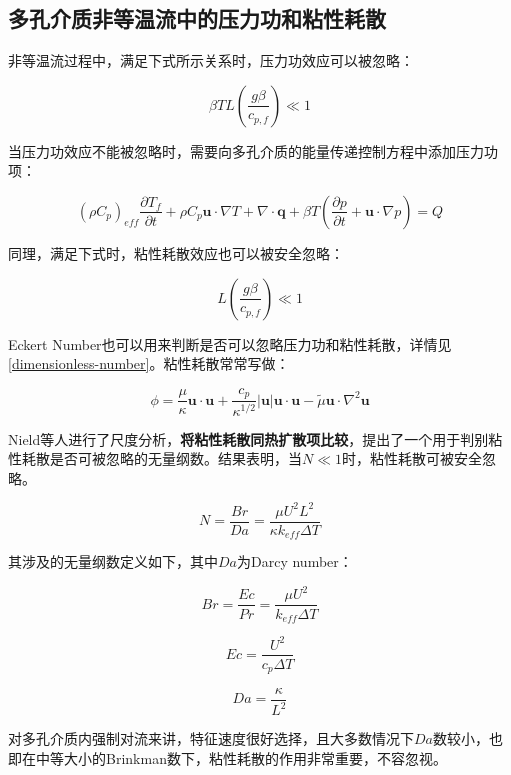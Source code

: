 \subsection{多孔介质非等温流中的压力功和粘性耗散}

非等温流过程中，满足下式所示关系时，压力功效应可以被忽略：

\begin{equation}
\beta TL\left(\frac{g\beta}{c_{p,f}}\right) \ll 1
\end{equation}

当压力功效应不能被忽略时，需要向多孔介质的能量传递控制方程中添加压力功项：

\begin{equation}
(\rho C_p)_{eff} \frac{\partial T_f}{\partial t} + \rho C_p\bm{u}\cdot\nabla T + \nabla\cdot\bm{q} + \boxed{\beta T \left(\frac{\partial p}{\partial t}+\bm{u}\cdot\nabla p\right)} = Q
\end{equation}

同理，满足下式时，粘性耗散效应也可以被安全忽略：

\begin{equation}
L \left( \frac{g\beta}{c_{p,f}} \right) \ll 1
\end{equation}

Eckert Number也可以用来判断是否可以忽略压力功和粘性耗散，详情见\autoref{dimensionless-number}。粘性耗散常常写做：

\begin{equation}
\phi = \frac{\mu}{\kappa}\bm{u\cdot u} + \frac{c_p}{\kappa^{1/2}}|\bm{u}|\bm{u\cdot u} - \tilde{\mu}\bm{u}\cdot\nabla^2\bm{u}
\end{equation}

Nield等人进行了尺度分析，\textbf{将粘性耗散同热扩散项比较}，提出了一个用于判别粘性耗散是否可被忽略的无量纲数。结果表明，当$ N\ll 1 $时，粘性耗散可被安全忽略。

\begin{equation}\label{Nield}
N = \frac{Br}{Da} = \frac{\mu U^2 L^2}{\kappa k_{eff}\Delta T}
\end{equation}

其涉及的无量纲数定义如下，其中$ Da $为Darcy number：

\[Br = \frac{Ec}{Pr} = \frac{\mu U^2}{k_{eff}\Delta T}\]

\[ Ec = \frac{U^2}{c_p \Delta T} \]

\[ Da = \frac{\kappa}{L^2} \]

对多孔介质内强制对流来讲，特征速度很好选择，且大多数情况下$ Da $数较小，也即在中等大小的Brinkman数下，粘性耗散的作用非常重要，不容忽视。

